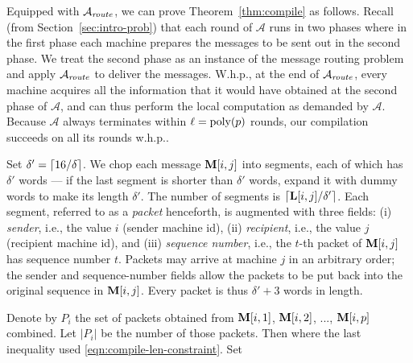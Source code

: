 \documentclass[sigconf]{acmart}
\def\vgap{\vspace{0mm}}
\def\extraspacing{\vspace{1mm} \noindent}
\def\A{\mathcal{A}}
\begin{document}
Equipped with $\A_\mit{route}$, we can prove Theorem~\ref{thm:compile} as follows. Recall (from Section~\ref{sec:intro-prob}) that each round of $\A$ runs in two phases where in the first phase each machine prepares the messages to be sent out in the second phase. We treat the second phase as an instance of the message routing problem and apply $\A_\mit{route}$ to deliver the messages. W.h.p., at the end of $\A_\mit{route}$, every machine acquires all the information that it would have obtained at the second phase of $\A$, and can thus perform the local computation as demanded by $\A$. Because $\A$ always terminates within $\ell = \operatorname*{poly}(p)$ rounds, our compilation succeeds on all its rounds w.h.p..

\extraspacing {\bf Our Algorithm.} Set $\delta' = \lceil 16/\delta \rceil$. We chop each message $\mathbf{M}[i,j]$ into segments, each of which has $\delta'$ words --- if the last segment is shorter than $\delta'$ words, expand it with dummy words to make its length $\delta'$. The number of segments is $\lceil \mathbf{L}[i,j] / \delta' \rceil$. Each segment, referred to as a {\em packet} henceforth, is augmented with three fields: (i) {\em sender}, i.e., the value $i$ (sender machine id), (ii) {\em recipient}, i.e., the value $j$ (recipient machine id), and (iii) {\em sequence number}, i.e., the $t$-th packet of $\mathbf{M}[i,j]$ has sequence number $t$. Packets may arrive at machine $j$ in an arbitrary order; the sender and sequence-number fields allow the packets to be put back into the original sequence in $\mathbf{M}[i,j]$. Every packet is thus $\delta' + 3$ words in length.

\vgap

Denote by $P_i$ the set of packets obtained from $\mathbf{M}[i,1]$, $\mathbf{M}[i,2]$, ..., $\mathbf{M}[i,p]$ combined. Let $|P_i|$ be the number of those packets. Then
where the last inequality used \eqref{eqn:compile-len-constraint}. Set
\end{document}
